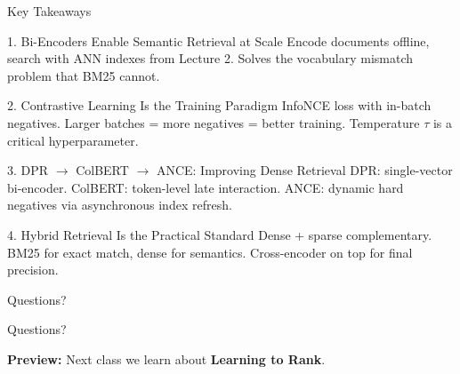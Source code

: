 \documentclass[aspectratio=169]{beamer}
\begin{document}
\begin{frame}[shrink=5]{Key Takeaways}
\begin{block}{1. Bi-Encoders Enable Semantic Retrieval at Scale}
Encode documents offline, search with ANN indexes from Lecture 2. Solves the vocabulary mismatch problem that BM25 cannot.
\end{block}

\begin{block}{2. Contrastive Learning Is the Training Paradigm}
InfoNCE loss with in-batch negatives. Larger batches = more negatives = better training. Temperature $\tau$ is a critical hyperparameter.
\end{block}

\begin{block}{3. DPR $\to$ ColBERT $\to$ ANCE: Improving Dense Retrieval}
DPR: single-vector bi-encoder. ColBERT: token-level late interaction. ANCE: dynamic hard negatives via asynchronous index refresh.
\end{block}

\begin{block}{4. Hybrid Retrieval Is the Practical Standard}
Dense + sparse complementary. BM25 for exact match, dense for semantics. Cross-encoder on top for final precision.
\end{block}
\end{frame}


\begin{frame}{Questions?}
\begin{center}
\Huge Questions?

\normalsize
\vspace{1em}
\textbf{Preview:} Next class we learn about \textbf{Learning to Rank}.
\end{center}
\end{frame}























\appendix
\end{document}
